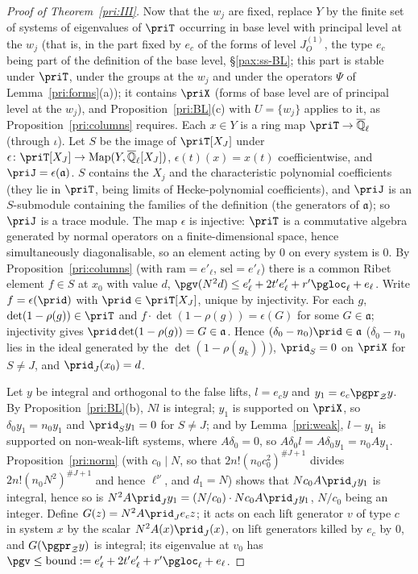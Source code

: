 \documentclass[10pt]{amsart}
\theoremstyle{definition}
\theoremstyle{remark}
\newcommand{\Q}{\mathbb Q}
\begin{document}
\begin{proof}[Proof of Theorem~\ref{pri:III}]
Now that the $w_j$ are fixed, replace $Y$ by the finite set of systems of eigenvalues of $\priT$
occurring in base level with principal level at the $w_j$ (that is, in the part fixed by $e_c$ of the forms of level $J_O^{(1)}$, the type $e_c$ being part of the definition of the base level, \S\ref{pax:ss-BL}; this part is stable under $\priT$, under the groups at the $w_j$ and under the operators $\Psi$ of Lemma~\ref{pri:forms}(a)); it contains $\priX$ (forms of base level
are of principal level at the $w_j$), and Proposition~\ref{pri:BL}(c) with $U=\{w_j\}$ applies to it,
as Proposition~\ref{pri:columns} requires. Each $x\in Y$ is a ring map $\priT\to\overline{\Q}_\ell$
(through $\iota$). Let $S$ be the image of $\priT[X_J]$ under $\epsilon\colon\priT[X_J]\to
\operatorname{Map}(Y,\overline{\Q}_\ell[X_J])$, $\epsilon(t)(x)=x(t)$ coefficientwise, and $\priJ=
\epsilon(\mathfrak a)$. $S$ contains the $X_j$ and the characteristic polynomial coefficients (they
lie in $\priT$, being limits of Hecke-polynomial coefficients), and $\priJ$ is an $S$-submodule
containing the families of the definition (the generators of $\mathfrak a$); so $\priJ$ is a trace
module. The map $\epsilon$ is injective: $\priT$ is a commutative algebra generated by normal
operators on a finite-dimensional space, hence simultaneously diagonalisable, so an element acting
by $0$ on every system is $0$. By Proposition~\ref{pri:columns} (with $\mathrm{ram}=e'_\ell$,
$\mathrm{sel}=e'_\ell$) there is a common Ribet element $f\in S$ at $x_0$ with value $d$,
$\pgv(N^2d)\le e'_\ell+2t'e'_\ell+r'\pgloc_\ell+e_\ell$. Write $f=\epsilon(\prid)$ with $\prid\in
\priT[X_J]$, unique by injectivity. For each $g$, $\det(1-\rho(g))\in\priT$ and $f\cdot\det(1-\rho(g))
=\epsilon(G)$ for some $G\in\mathfrak a$; injectivity gives $\prid\det(1-\rho(g))=G\in\mathfrak a$.
Hence
$(\delta_0-n_0)\prid\in\mathfrak a$ ($\delta_0-n_0$ lies in the ideal generated by the
$\det(1-\rho(g_k))$), $\prid_S=0$ on $\priX$ for $S\ne J$, and $\prid_J(x_0)=d$.

Let $y$ be integral and orthogonal to the false lifts, $l=e_cy$ and $y_1=e_c\pgpr_{\mathcal Z}y$. By
Proposition~\ref{pri:BL}(b), $Nl$ is integral; $y_1$ is supported on $\priX$, so $\delta_0y_1=n_0y_1$
and $\prid_Sy_1=0$ for $S\ne J$; and by Lemma~\ref{pri:weak}, $l-y_1$ is supported on non-weak-lift
systems, where $A\delta_0=0$, so $A\delta_0l=A\delta_0y_1=n_0Ay_1$. Proposition~\ref{pri:norm} (with
$c_0\mid N$, so that $2n!(n_0c_0^2)^{\#J+1}$ divides $2n!(n_0N^2)^{\#J+1}$ and hence $\ell^\nu$, and
$d_1=N$) shows that $Nc_0A\prid_Jy_1$ is integral, hence so is $N^2A\prid_Jy_1=(N/c_0)\cdot Nc_0A
\prid_Jy_1$, $N/c_0$ being an integer. Define $G(z)=N^2A\prid_J e_cz$; it acts
on each lift generator $v$ of type $c$ in system $x$ by the scalar $N^2A(x)\prid_J(x)$, on lift
generators killed by $e_c$ by $0$, and $G(\pgpr_{\mathcal Z}y)$ is integral; its eigenvalue at $v_0$
has $\pgv\le\mathrm{bound}:=e'_\ell+2t'e'_\ell+r'\pgloc_\ell+e_\ell$.


\end{proof}
\end{document}
